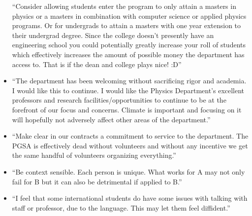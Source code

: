 \documentclass[oneside]{book}   %
\begin{document}
\begin{itemize}
“Consider allowing students enter the program to only attain a masters in 	physics or a masters in combination with computer science or applied 	physics programs. Or for undergrads to attain a masters with one year extension to their undergrad degree. Since the college doesn't presently have an engineering school you could potentially greatly increase your roll of students which effectively increases the amount of possible money the department has access to. That is if the dean and college plays nice! :D”
	\item “The department has been welcoming without sacrificing rigor and academia. I would like this to continue. I would like the Physics Department's excellent professors and research facilities/opportunities to continue to be at the forefront of our focus and concerns. Climate is important and focusing on it will hopefully not adversely affect other areas of the department.”
	\item “Make clear in our contracts a commitment to service to the department. The PGSA is effectively dead without volunteers and without any incentive we get the same handful of volunteers organizing everything.”
	\item “Be context sensible. Each person is unique. What works for A may not only fail for B but it can also be detrimental if applied to B.”
	\item “I feel that some international students do have some issues with talking with staff or professor, due to the language. This may let them feel diffident.”
\end{itemize}
\end{document}
